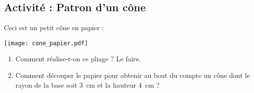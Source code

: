 
\subsection*{Activité : Patron d'un cône}

Ceci est un petit cône en papier :
\begin{center}
    \texttt{[image: cone\_papier.pdf]}
\end{center}

\begin{enumerate}
    \item
        Comment réalise-t-on ce pliage ? Le faire.
    \item
        Comment découper le papier pour obtenir au bout du compte un cône dont le rayon de la base soit \SI{3}{\centi\meter} et la hauteur \SI{4}{\centi\meter} ?
\end{enumerate}
